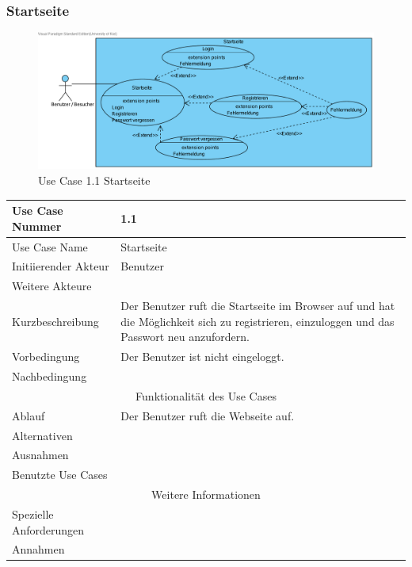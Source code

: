 \documentclass[10pt,a4paper]{article}
\begin{document}
\subsubsection{Startseite}
	\begin{figure}[H]
	\centering
	  \includegraphics[width=.8\textheight, angle=90]{gfx/webseite/startseite.pdf}
          \caption{Use Case 1.1 Startseite}
	\end{figure}
	\begin{tabularx}{\textwidth}{|l|X|}
	\hline Use Case Nummer & 1.1 \\ 
	\hline Use Case Name & Startseite \\ 
	\hline Initiierender Akteur & Benutzer \\
	\hline Weitere Akteure &  \\
	\hline Kurzbeschreibung & Der Benutzer ruft die Startseite im Browser auf und hat die M\"oglichkeit sich zu registrieren, einzuloggen und das Passwort neu anzufordern. \\
	\hline Vorbedingung & Der Benutzer ist nicht eingeloggt. \\
	\hline Nachbedingung &  \\
	\hline \multicolumn{2}{|c|}{Funktionalität des Use Cases}\\
	\hline Ablauf & Der Benutzer ruft die Webseite auf. \\
	\hline Alternativen &  \\
	\hline Ausnahmen &  \\
	\hline Benutzte Use Cases &  \\
	\hline \multicolumn{2}{|c|}{Weitere Informationen} \\
	\hline Spezielle Anforderungen &  \\
	\hline Annahmen &  \\
	\hline
	\end{tabularx} 
\end{document}
